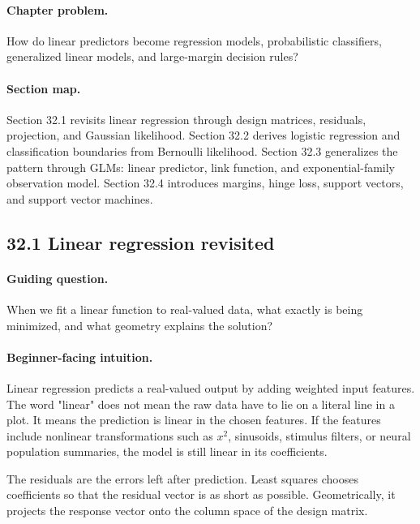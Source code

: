 \paragraph{Chapter problem.}
How do linear predictors become regression models, probabilistic classifiers, generalized linear models, and large-margin decision rules?

\paragraph{Section map.}
Section 32.1 revisits linear regression through design matrices, residuals, projection, and Gaussian likelihood. Section 32.2 derives logistic regression and classification boundaries from Bernoulli likelihood. Section 32.3 generalizes the pattern through GLMs: linear predictor, link function, and exponential-family observation model. Section 32.4 introduces margins, hinge loss, support vectors, and support vector machines.

\subsection{32.1 Linear regression revisited}

\paragraph{Guiding question.}
When we fit a linear function to real-valued data, what exactly is being minimized, and what geometry explains the solution?

\paragraph{Beginner-facing intuition.}
Linear regression predicts a real-valued output by adding weighted input features. The word "linear" does not mean the raw data have to lie on a literal line in a plot. It means the prediction is linear in the chosen features. If the features include nonlinear transformations such as \(x^2\), sinusoids, stimulus filters, or neural population summaries, the model is still linear in its coefficients.

The residuals are the errors left after prediction. Least squares chooses coefficients so that the residual vector is as short as possible. Geometrically, it projects the response vector onto the column space of the design matrix.

